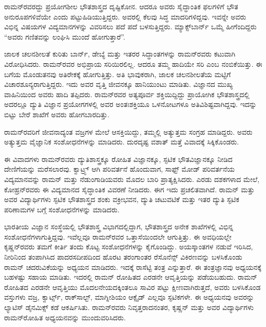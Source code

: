 ರಾಮನ್‍ರವರದ್ದು ಪ್ರಯೋಗಶೀಲ ಭೌತಶಾಸ್ತ್ರದ ದೃಷ್ಟಿಕೋನ. ಆದರೂ ಅವರು ಸೈದ್ಧಾಂತಿಕ ಫಲಗಳಿಗೆ ಭೌತ ಅನುರೂಪಗಳಿವೆಯೇ ಎಂದು ಪಟ್ಟುಹಿಡಿಯುತ್ತಿದ್ದರು. ಅವರಲ್ಲಿ ಕೆಲವು ಸಿದ್ಧ ಮಾದರಿಗಳಿದ್ದವು. ಇವನ್ನೇ ಅವರು ವಿಭಿನ್ನ ವಿಷಯಗಳ ವಿದ್ಯಮಾನಗಳನ್ನು ವಿವರಿಸಲು ಪದೆ ಪದೆ ಬಳಸುತ್ತಿದ್ದರು. ಮ್ಯಾಕ್ಸ್‌ಬಾರ್ನ್ ಒಮ್ಮೆ ಹೀಗೆಂದಿದ್ದರು “ಅವರು ಗಣಿತವನ್ನು ಲಂಘಿಸಿ ಮುಂದೆ ಹೋಗುತ್ತಾರೆ”.

ಜಾಲಕ ಚಲನಶೀಲತೆ ಕುರಿತು ಬಾರ್ನ್, ಡೇಬ್ಯೆ ಮತ್ತು ಇತರರ ಸಿದ್ಧಾಂತಗಳನ್ನು ರಾಮನ್‍ರವರು ಕಟುವಾಗಿ ವಿರೋಧಿಸಿದರು. ರಾಮನ್‍ರವರ ಅಭಿಪ್ರಾಯ ಸರಿಯಿರಲಿಲ್ಲ. ಆದರೂ ತಮ್ಮ ಹಾದಿಯೇ ಸರಿ ಎಂಬ ನಂಬಿಕೆಯಿತ್ತು. ಈ ಬಗೆಯ ಮೊಂಡುತನವು ಅತಿರೇಕಕ್ಕೆ ಹೋಗುತ್ತಿತ್ತು. ಅತಿ ಭಾವುಕರಾಗಿ, ಜಾಲಕ ಚಲನಶೀಲತೆಯ ಮಟ್ಟಿಗೆ ವಿಚಾರಶೂನ್ಯರಾಗುತ್ತಿದ್ದರು. ಇದು ಅವರ ವೃತ್ತಿ ಜೀವನಕ್ಕೂ ಹಾನಿಯುಂಟು ಮಾಡಿತು. ವಿಜ್ಞಾನದ ಮುಖ್ಯ ವಾಹಿನಿಯಿಂದ ಅವರು ಹಾದಿ ತಪ್ಪಿದರು. ರಾಮನ್‍ರವರ ಅತ್ಯಪೂರ್ವ ಶಕ್ತಿಯಿದ್ದಿದ್ದು ಪ್ರಾಯೋಗಿಕ ಭೌತಶಾಸ್ತ್ರದಲ್ಲಿ ಅದರಲ್ಲೂ ದ್ಯುತಿ ವಿಜ್ಞಾನ ಪ್ರಯೋಗಗಳಲ್ಲಿ ಅವರ ಅಂತಃಶಕ್ತಿಯೂ ಒಳನೋಟಗಳೂ ಅತಿವಿಶಿಷ್ಟವಾಗಿದ್ದವು. ಇದನ್ನು ಬಿಟ್ಟು ಬೇರೆ ಶಾಖೆಗೆ ಅವರು ಹೋಗಬಾರದಿತ್ತು.

ರಾಮನ್‍ರವರಿಗೆ ಜೀವನಾದ್ಯಂತ ವಜ್ರಗಳ ಮೇಲೆ ಆಸಕ್ತಿಯಿದ್ದು, ತಮ್ಮಲ್ಲಿ ಅತ್ಯುತ್ತಮ ಸಂಗ್ರಹ ಮಾಡಿದ್ದರು. ಅವರು ಅತ್ಯುತ್ತಮ ವೈಜ್ಞಾನಿಕ ಸಂಶೋಧನೆಗಳನ್ನು ಮಾಡಿದರು. ದುರದೃಷ್ಟ ವಶಾತ್ ಮತ್ತೆ ವಿವಾದಕ್ಕೆ ಸಿಕ್ಕಿಕೊಂಡರು.

ಈ ವಿವಾದಗಳು ರಾಮನ್‍ರವರು ದ್ಯುತಿಶಾಸ್ತ್ರಕ್ಕೂ ರೋಹಿತ ವಿಜ್ಞಾನಕ್ಕೂ, ಸ್ಫಟಿಕ ಭೌತವಿಜ್ಞಾನಕ್ಕೂ ನೀಡಿದ ದೇಣಿಗೆಯನ್ನು ಮರೆಸಲಾರವು. ಕ್ವಾಟ್ರ್ಸ್ ಆಗಿ ಪರಿವರ್ತನೆ ಹೊಂದುವಾಗ, ಸಾಫ್ಟ್ ಮೋಡ್ ಪರಿವರ್ತನೆಯ ವಿದ್ಯಮಾನವನ್ನು ರಾಮನ್ ಮತ್ತು ನೆಡುಂಗಾಡಿಯವರು ಮೊದಲ ಬಾರಿ ಪ್ರಾತ್ಯಕ್ಷಿಸಿದರು. ಎರಡು ದಶಕಗಳಾದ ಮೇಲೆ, ಕೋಹ್ರನ್‍ರವರು ಈ ವಿದ್ಯಮಾನದ ಸೈದ್ಧಾಂತಿಕ ವಿವರಣೆ ನೀಡಿದರು. ಈಗ ಇದು ಪ್ರಚಲಿತವಾಗಿದೆ. ರಾಮನ್ ಮತ್ತು ಅವರ ವಿದ್ಯಾರ್ಥಿಗಳು ಸ್ಫಟಿಕ ಭೌತಶಾಸ್ತ್ರದ ಶಂಕು ವಕ್ರೀಭವನ, ದ್ಯುತಿ ಚಟುವಟಿಕೆ ಮತ್ತು ಇತರ ದ್ಯುತಿ ಸ್ಫಟಿಕ ಪರಿಣಾಮಗಳ ಬಗ್ಗೆ ಸಂಶೋಧನೆಗಳನ್ನು ಮಾಡಿದರು.

ಭಾರತೀಯ ವಿಜ್ಞಾನ ಸಂಸ್ಥೆಯಲ್ಲಿ ಭೌತಶಾಸ್ತ್ರ ವಿಭಾಗದಲ್ಲಿದ್ದಾಗ, ಭೌತಶಾಸ್ತ್ರದ ಅನೇಕ ಶಾಖೆಗಳಲ್ಲಿ ವಿಭಿನ್ನ ಸಂಶೋಧನೆಗಳಾಗುತ್ತಿದ್ದವು. ಇವೆಲ್ಲವೂ ರಾಮನ್‍ರವರ ಒತ್ತಾಸೆಯಿಂದಲೇ ಆಗುತ್ತಿತ್ತು. ಈ ಅವಧಿಯಲ್ಲೇ ಕೃಷ್ಣನ್‍ರವರು ತಮಗೆ ಕೀರ್ತಿ ತಂದು ಕೊಟ್ಟ ಸಂಶೋಧನೆಗಳನ್ನು ಕೈಗೊಂಡಿದ್ದು. ಅಯಸ್ಕಾಂತಗಳ ನಡುವೆ ಇರಿಸಿದ, ನೀರಿನಿಂದ ತಂಪಾಗಿಸಿದ ಪಾದರಸದೀಪದಿಂದ ಹೊರಟ ತರಂಗಾಂತರ  ರೆಸೊನೆನ್ಸ್ ವಿಕಿರಣವನ್ನು ಬಳಸಿಕೊಂಡು ರಾಮನ್ ಚದರುವಿಕೆಯನ್ನು ಅಧ್ಯಯನ ಮಾಡಿದರು. ಇದಕ್ಕೆ ರಾಸೆಟ್ಟಿ ತಂತ್ರ ಎನ್ನುತ್ತಾರೆ. ಈ ತಂತ್ರಜ್ಞಾನವು ಅಧ್ಯಯನಕ್ಕೆ ಬಹಳಷ್ಟು ಸಹಾಯ ಮಾಡಿತು. ಇದರಲ್ಲಿ ರಾಮನ್ ರೋಹಿತದ  ಎರಡನೇ ಆವೃತ್ತಿಯನ್ನು ಪಡೆಯಬಹುದು. ರಾಮನ್ ರೋಹಿತದ  ಎರಡನೇ ಆವೃತ್ತಿಯು ಮೊದಲನೇಯದಕ್ಕಿಂತಲೂ ಸಾವಿರ ಪಟ್ಟು ಕ್ಷೀಣವಾಗಿರುತ್ತದೆ, ಅವರು ಬಳಸಿಕೊಂಡ ವಸ್ತುಗಳು ವಜ್ರ, ಕ್ವಾರ್ಟ್ಸ್, ರಾಕ್‍ಸಾಲ್ಟ್, ಮಾಗ್ನೀಶಿಯಂ ಆಕ್ಸೈಡ್\enginline{-} ಎಲ್ಲವೂ ಸ್ಫಟಿಕಗಳೇ. ಈ ಅಧ್ಯಯನವು ಅವರನ್ನು ಲ್ಯಾಟಿಸ್ ಡೈನಮಿಕ್ಸ್ ಕಡೆ ಆಕರ್ಷಿಸಿತು. ರಾಮನ್‍ರವರು ನಿವೃತ್ತರಾದನಂತರ, ಕೃಷ್ಣನ್ ಮತ್ತು ಅವರ ವಿದ್ಯಾರ್ಥಿಗಳು ರಾಮನ್‍ರೋಹಿತ ಅಧ್ಯಯನವನ್ನು ಮುಂದುವರಿಸಿದರು.

